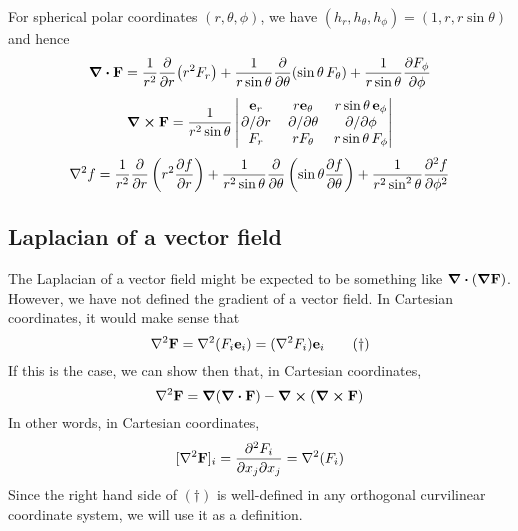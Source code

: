 For spherical polar coordinates \((r, \theta, \phi)\), we have \((h_r, h_\theta, h_\phi) = (1, r, r\sin\theta)\) and hence
\[
	\div{\vb F} = \frac{1}{r^2} \pdv{r}(r^2 F_r) + \frac{1}{r\sin\theta} \pdv{\theta}(\sin \theta\, F_\theta) + \frac{1}{r\sin\theta} \pdv{F_\phi}{\phi}
\]
\[
	\curl{\vb F} = \frac{1}{r^2\sin\theta} \begin{vmatrix}
		\vb e_r  & r \vb e_\theta & r\sin\theta\, \vb e_\phi \\
		\pdv*{r} & \pdv*{\theta}  & \pdv*{\phi}              \\
		F_r      & r F_\theta     & r\sin\theta\, F_\phi
	\end{vmatrix}
\]
\[
	\laplacian{f} = \frac{1}{r^2} \pdv{r} \left( r^2 \pdv{f}{r} \right) + \frac{1}{r^2 \sin\theta} \pdv{\theta} \left( \sin \theta \pdv{f}{\theta} \right) + \frac{1}{r^2\sin^2 \theta} \pdv[2]{f}{\phi}
\]

\subsection{Laplacian of a vector field}
The Laplacian of a vector field might be expected to be something like \(\div(\grad {\vb F})\).
However, we have not defined the gradient of a vector field.
In Cartesian coordinates, it would make sense that
\begin{equation}
	\laplacian{\vb F} = \laplacian(F_i \vb e_i) = (\laplacian{F_i})\vb e_i
	\tag{\(\dagger\)}
\end{equation}
If this is the case, we can show then that, in Cartesian coordinates,
\[
	\laplacian{\vb F} = \grad(\div{\vb F}) - \curl(\curl{\vb F})
\]
In other words, in Cartesian coordinates,
\[
	[\laplacian{\vb F}]_i = \pdv{F_i}{x_j}{x_j} = \laplacian(F_i)
\]
Since the right hand side of \((\dagger)\) is well-defined in any orthogonal curvilinear coordinate system, we will use it as a definition.
